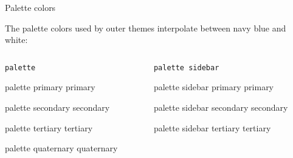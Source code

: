 \documentclass{beamer}
\begin{document}
\begin{frame}[fragile]{Palette colors}

The palette colors used by outer themes interpolate between navy blue and white:

\vfill

\begin{columns}
\begin{column}{.5\textwidth}

\centering
\verb|palette|
\vspace{1ex}

\begin{beamercolorbox}[sep=4pt,center]{palette primary}
primary
\end{beamercolorbox}

\begin{beamercolorbox}[sep=4pt,center]{palette secondary}
secondary
\end{beamercolorbox}

\begin{beamercolorbox}[sep=4pt,center]{palette tertiary}
tertiary
\end{beamercolorbox}

\begin{beamercolorbox}[sep=4pt,center]{palette quaternary}
quaternary
\end{beamercolorbox}

\end{column}
\begin{column}{.5\textwidth}

\centering
\verb|palette sidebar|
\vspace{1ex}

\begin{beamercolorbox}[sep=4pt,center]{palette sidebar primary}
primary
\end{beamercolorbox}

\begin{beamercolorbox}[sep=4pt,center]{palette sidebar secondary}
secondary
\end{beamercolorbox}

\begin{beamercolorbox}[sep=4pt,center]{palette sidebar tertiary}
tertiary
\end{beamercolorbox}


\end{column}
\end{columns}
\end{frame}
\end{document}
